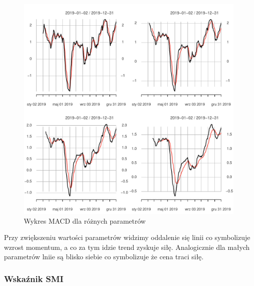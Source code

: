 \documentclass[12pt, a4paper]{article}\usepackage[]{graphicx}\usepackage[]{color}
\makeatletter
\def\maxwidth{ %
  \ifdim\Gin@nat@width>\linewidth
    \linewidth
  \else
    \Gin@nat@width
  \fi
}
\newenvironment{knitrout}{}{} %
\makeatother
\begin{document}
\begin{knitrout}
\color{fgcolor}\begin{figure}[H]

{\centering \includegraphics[width=\maxwidth]{figure/unnamed-chunk-6-1} 

}

\caption[Wykres MACD dla różnych parametrów]{Wykres MACD dla różnych parametrów}\label{fig:unnamed-chunk-6}
\end{figure}

\end{knitrout}

Przy zwiększeniu wartości parametrów widzimy oddalenie się linii co symbolizuje wzrost momentum, a co za tym idzie trend zyskuje siłę. Analogicznie dla małych parametrów lniie są blisko siebie co symbolizuje że cena traci siłę.

\subsubsection{Wskaźnik SMI}
\end{document}
